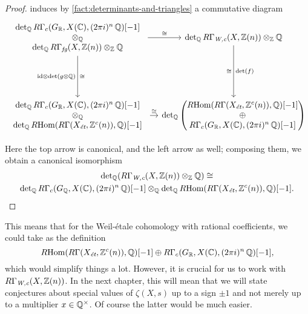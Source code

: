 \begin{proposition}
\begin{proof}
    induces by \ref{fact:determinants-and-triangles} a commutative diagram
    {\small
      \[ \begin{tikzcd}[row sep=5em,column sep=1em]
          {\begin{array}{c}
             \det\nolimits_\QQ R\Gamma_c (G_\RR, X (\CC), (2\pi i)^n\,\QQ) [-1]\\
             \otimes_\QQ \\
             \det\nolimits_\QQ R\Gamma_\text{\it fg} (X, \ZZ (n)) \otimes_\ZZ \QQ
           \end{array}} \ar{r}{\isom} \ar{d}{\isom}[swap]{\idid\otimes \det (g\otimes\QQ)} & \det\nolimits_\QQ R\Gamma_\text{\it W,c} (X, \ZZ (n)) \otimes_\ZZ \QQ \ar{d}{\det (f)}[swap]{\isom} \\
         {\begin{array}{c}
            \det\nolimits_\QQ R\Gamma_c (G_\RR, X (\CC), (2\pi i)^n\,\QQ) [-1]\\
            \otimes_\QQ \\
            \det\nolimits_\QQ \RHom (R\Gamma (X_\text{\it ét}, \ZZ^c (n)), \QQ) [-1]
          \end{array}} \ar{r}{\isom} & \det\nolimits_\QQ {\begin{pmatrix}
            \RHom (R\Gamma (X_\text{\it ét}, \ZZ^c (n)), \QQ) [-1]\\
            \oplus \\
            R\Gamma_c (G_\RR, X (\CC), (2\pi i)^n\,\QQ) [-1]
          \end{pmatrix}}
      \end{tikzcd} \]}

    Here the top arrow is canonical, and the left arrow as well; composing them,
    we obtain a canonical isomorphism
    \begin{multline*}
      \det\nolimits_{\mathbb{Q}} (R\Gamma_\text{\it W,c} (X, \mathbb{Z} (n)) \otimes_{\mathbb{Z}} \mathbb{Q}) \cong \\
      \det\nolimits_{\mathbb{Q}} R\Gamma_c (G_{\mathbb{Q}}, X (\mathbb{C}), (2\pi i)^n\,\mathbb{Q}) [-1]
      \otimes_{\mathbb{Q}}
      \det\nolimits_{\mathbb{Q}} R\!\operatorname{Hom} (R\Gamma (X_\text{\it ét}, \mathbb{Z}^c (n)), \mathbb{Q}) [-1].
    \end{multline*}
  \end{proof}
\end{proposition}

\begin{remark}
  This means that for the Weil-étale cohomology with rational coefficients, we
  could take as the definition
  \[ R\!\operatorname{Hom} (R\Gamma (X_\text{\it ét}, \mathbb{Z}^c (n)), \mathbb{Q}) [-1] \oplus
    R\Gamma_c (G_{\mathbb{R}}, X (\mathbb{C}), (2\pi i)^n\,\mathbb{Q}) [-1], \]
  which would simplify things a lot. However, it is crucial for us to work with
  $R\Gamma_\text{\it W,c} (X,\mathbb{Z} (n))$. In the next chapter, this will mean that
  we will state conjectures about special values of $\zeta (X,s)$ up to a sign
  $\pm 1$ and not merely up to a multiplier $x\in \mathbb{Q}^\times$. Of course the
  latter would be much easier.
\end{remark}

